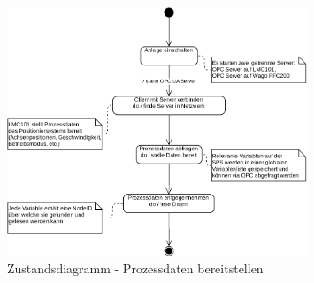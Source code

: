 \documentclass[../Bachelorarbeit.tex]{subfiles}
\begin{document}
\begin{figure}[H]
    \centering
    \includegraphics[width=0.8\textwidth]{Images/prozdata_zustand.pdf}
    \caption[Zustandsdiagramm Prozessdaten]{Zustandsdiagramm - Prozessdaten bereitstellen}
    \label{fig:my-img7}
\end{figure}
\end{document}
